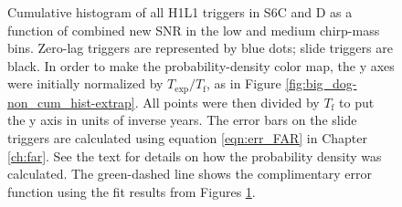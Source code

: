 \begin{figure}[p]
\center
{}
\label{fig:big_dog-cum_hist-extrap}
\caption{Cumulative histogram of all H1L1 triggers in S6C and D as a function of combined new \ac{SNR} in the low and medium chirp-mass bins. Zero-lag triggers are represented by blue dots; slide triggers are black. In order to make the probability-density color map, the y axes were initially normalized by $T_{\mathrm{exp}}/T_{\mathrm{f}}$, as in Figure \ref{fig:big_dog-non_cum_hist-extrap}. All points were then divided by $T_{\mathrm{f}}$ to put the y axis in units of inverse years. The error bars on the slide triggers are calculated using equation \ref{eqn:err_FAR} in Chapter \ref{ch:far}. See the text for details on how the probability density was calculated. The green-dashed line shows the complimentary error function using the fit results from Figures \ref{fig:big_dog-cum_hist-extrap}.}
\end{figure}

